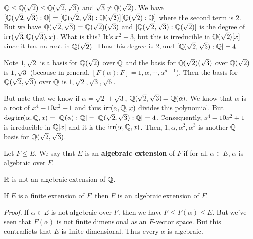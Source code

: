 \documentclass{../mathnotes}
\begin{document}
\begin{exmp}
    $\mathbb{Q}\leq \mathbb{Q}(\sqrt{2})\leq\mathbb{Q}(\sqrt{2},\sqrt{3})$ and $\sqrt{3}\neq \mathbb{Q}(\sqrt{2})$. We have
    $[\mathbb{Q}(\sqrt{2},\sqrt{3}):\mathbb{Q}]=[\mathbb{Q}(\sqrt{2},\sqrt{3}):\mathbb{Q}(\sqrt{2})][\mathbb{Q}(\sqrt{2}):\mathbb{Q}]$ where the second term is 2.
    But we have $\mathbb{Q}(\sqrt{2},\sqrt{3})=\mathbb{Q}(\sqrt{2})(\sqrt{3})$ and $[\mathbb{Q}(\sqrt{2},\sqrt{3}):\mathbb{Q}(\sqrt{2})]$ is the degree
    of $\operatorname{irr}(\sqrt{3},\mathbb{Q}(\sqrt{3}),x)$. What is this? It's $x^2-3$, but this is irreducible in $\mathbb{Q}(\sqrt{2})[x]$ since it has
    no root in $\mathbb{Q}(\sqrt{2})$. Thus this degree is 2, and $[\mathbb{Q}(\sqrt{2},\sqrt{3}):\mathbb{Q}]=4$.

    Note $1, \sqrt{2}$ is a basis for $\mathbb{Q}(\sqrt{2})$ over $\mathbb{Q}$ and the basis for $\mathbb{Q}(\sqrt{2})(\sqrt{3})$ over $\mathbb{Q}(\sqrt{2})$ is 
    $1,\sqrt{3}$ (because in general, $[F(\alpha):F]=1,\alpha,\cdots,\alpha^{d-1}$). Then the basis for $\mathbb{Q}(\sqrt{2},\sqrt{3})$
    over $\mathbb{Q}$ is $1,\sqrt{2},\sqrt{3},\sqrt{6}$.

    But note that we know if $\alpha=\sqrt{2}+\sqrt{3}$, $\mathbb{Q}(\sqrt{2},\sqrt{3})=\mathbb{Q}(\alpha)$. We know that $\alpha$ is a root of
    $x^4-10x^2+1$ and thus $\operatorname{irr}(\alpha,\mathbb{Q},x)$ divides this polynomial. But $\deg\operatorname{irr}(\alpha,\mathbb{Q},x)=[\mathbb{Q}(\alpha):\mathbb{Q}]=[\mathbb{Q}(\sqrt{2},\sqrt{3}):\mathbb{Q}]=4$.
    Consequently, $x^4-10x^2+1$ is irreducible in $\mathbb{Q}[x]$ and it is the $\operatorname{irr}(\alpha,\mathbb{Q},x)$. Then, $1,\alpha,\alpha^2,\alpha^3$ is another $\mathbb{Q}$-basis
    for $\mathbb{Q}(\sqrt{2},\sqrt{3})$.
\end{exmp}

\begin{defn}
    Let $F\leq E$. We say that $E$ is an \textbf{algebraic extension} of $F$ if for all $\alpha\in E$, $\alpha$ is algebraic over $F$.
\end{defn}

\begin{exmp}
    $\mathbb{R}$ is not an algebraic extension of $\mathbb{Q}$.
\end{exmp}

\begin{thm}
    If $E$ is a finite extension of $F$, then $E$ is an algebraic extension of $F$.
\end{thm}
\begin{proof}
    If $\alpha\in E$ is not algebraic over $F$, then we have $F\leq F(\alpha)\leq E$. But we've seen that $F(\alpha)$ is not
    finite dimensional as an $F$-vector space. But this contradicts that $E$ is finite-dimensional. Thus every $\alpha$ is
    algebraic.
\end{proof}
\end{document}
